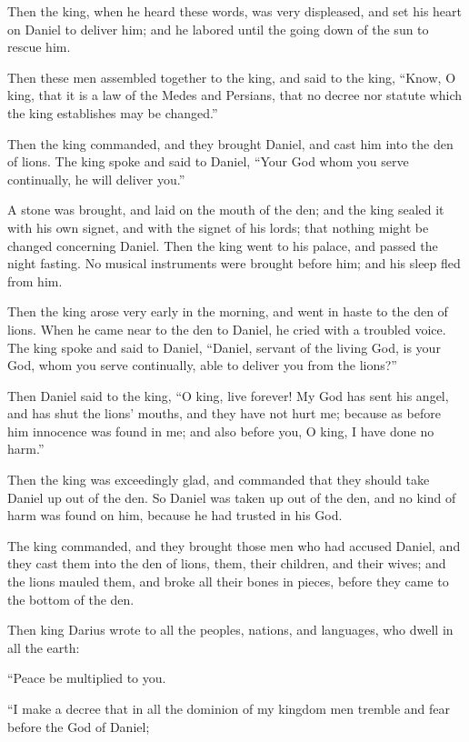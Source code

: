 {Then the king, when he heard these words, was very displeased, and set his heart on Daniel to deliver him; and he labored until the going down of the sun to rescue him.
\par }{\PP {}Then these men assembled together to the king, and said to the king, “Know, O king, that it is a law of the Medes and Persians, that no decree nor statute which the king establishes may be changed.”
\par }{\PP {}Then the king commanded, and they brought Daniel, and cast him into the den of lions. The king spoke and said to Daniel, “Your God whom you serve continually, he will deliver you.”
\par }{\PP {}A stone was brought, and laid on the mouth of the den; and the king sealed it with his own signet, and with the signet of his lords; that nothing might be changed concerning Daniel.
Then the king went to his palace, and passed the night fasting. No musical instruments were brought before him; and his sleep fled from him.
\par }{\PP {}Then the king arose very early in the morning, and went in haste to the den of lions.
When he came near to the den to Daniel, he cried with a troubled voice. The king spoke and said to Daniel, “Daniel, servant of the living God, is your God, whom you serve continually, able to deliver you from the lions?”
\par }{\PP {}Then Daniel said to the king, “O king, live forever!
My God has sent his angel, and has shut the lions’ mouths, and they have not hurt me; because as before him innocence was found in me; and also before you, O king, I have done no harm.”
\par }{\PP {}Then the king was exceedingly glad, and commanded that they should take Daniel up out of the den. So Daniel was taken up out of the den, and no kind of harm was found on him, because he had trusted in his God.
\par }{\PP {}The king commanded, and they brought those men who had accused Daniel, and they cast them into the den of lions, them, their children, and their wives; and the lions mauled them, and broke all their bones in pieces, before they came to the bottom of the den.
\par }{\PP {}Then king Darius wrote to all the peoples, nations, and languages, who dwell in all the earth:
\par }{\PI “Peace be multiplied to you.
\par }{\PI {}“I make a decree that in all the dominion of my kingdom men tremble and fear before the God of Daniel;
}
